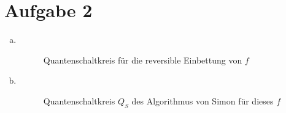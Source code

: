 \documentclass[a4paper]{scrartcl}
\begin{document}
\section*{Aufgabe 2}
\begin{enumerate}[a)]
\item ~\\
\begin{figure}[htp] 
\caption{Quantenschaltkreis für die reversible Einbettung von $f$}
\end{figure}

\item ~\\
\begin{figure}[htp] 
\caption{Quantenschaltkreis $Q_S$ des Algorithmus von Simon für dieses $f$}
\end{figure}


\end{enumerate}
\end{document}
